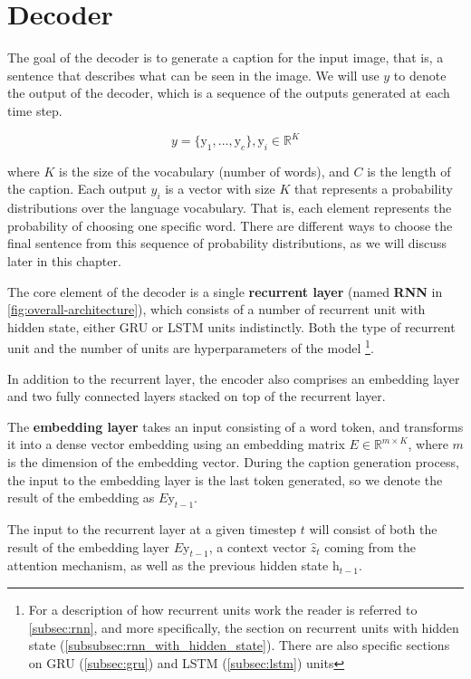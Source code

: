 \section{Decoder}\label{sec:decoder}

The goal of the decoder is to generate a caption for the input image, that is, a  sentence that describes what can be seen in the image. We will use $y$ to denote the output of the decoder, which is a sequence of the outputs generated at each time step.

$$y = \{\text{y}_1,..., \text{y}_c\}, \text{y}_i \in \mathbb{R}^K$$

where $K$ is the size of the vocabulary (number of words), and $C$ is the length of the caption.
Each output $y_i$ is a vector with size $K$ that represents a probability distributions over the language vocabulary. That is, each element represents the probability of choosing one specific word. There are different ways to choose the final sentence from this sequence of probability distributions, as we will discuss later in this chapter.

The core element of the decoder is a single \textbf{recurrent layer} (named \textbf{RNN} in \cref{fig:overall-architecture}), which consists of a number of recurrent unit with hidden state, either GRU or LSTM units indistinctly. Both the type of recurrent unit and the number of units are hyperparameters of the model \footnote{For a description of how recurrent units work the reader is referred to \cref{subsec:rnn}, and more specifically, the section on recurrent units with hidden state (\cref{subsubsec:rnn_with_hidden_state}). There are also specific sections on GRU (\cref{subsec:gru}) and LSTM (\cref{subsec:lstm}) units}.

In addition to the recurrent layer, the encoder also comprises an embedding layer and two fully connected layers stacked on top of the recurrent layer. 

The \textbf{embedding layer} takes an input consisting of a word token, and transforms it into a dense vector embedding using an embedding matrix $E \in \mathbb{R}^{m \times K}$, where $m$ is the dimension of the embedding vector. During the caption generation process, the input to the embedding layer is the last token generated, so we denote the result of the embedding as $E\text{y}_{t-1}$.

The input to the recurrent layer at a given timestep $t$ will consist of both the result of the embedding layer $E\text{y}_{t-1}$, a context vector $\hat{z}_t$ coming from the attention mechanism, as well as the previous hidden state $\text{h}_{t-1}$. 

